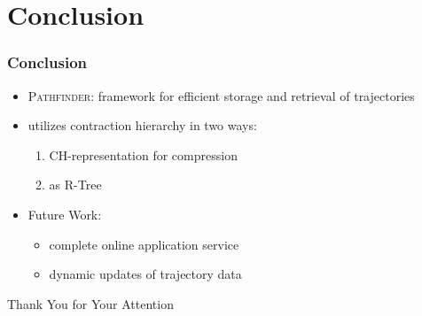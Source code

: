 \documentclass[10pt, t,
aspectratio=1610,%
usenames,
dvipsnames,
]{beamer}
\newcommand{\pathfinder}{\textsc{Pathfinder}\xspace}
\newcommand{\chrep}{CH-representation\xspace}
\begin{document}
\section{Conclusion}
\begin{frame}
	\frametitle{Conclusion}
	\begin{itemize}
		\item \pathfinder: framework for efficient storage and retrieval of trajectories \pause
		\item utilizes contraction hierarchy in two ways: \pause
		      \begin{enumerate}
			      \item \chrep for compression \pause
			      \item as R-Tree \pause
		      \end{enumerate}
		\item Future Work: \pause
		      \begin{itemize}
			      \item complete online application service \pause
			      \item dynamic updates of trajectory data \pause
		      \end{itemize}
	\end{itemize}
	\bigskip
	\bigskip
	\centering \Huge Thank You for Your Attention

\end{frame}


\end{document}
